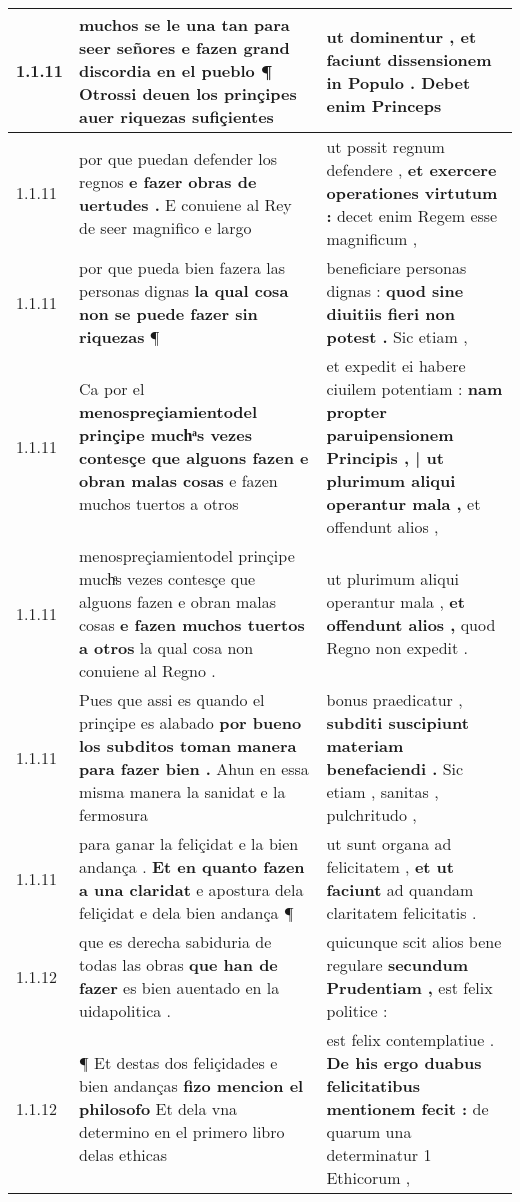 \begin{tabular}{|p{1cm}|p{6.5cm}|p{6.5cm}|}
1.1.11 & muchos se le una tan para seer señores \textbf{ e fazen grand discordia en el pueblo ¶ } Otrossi deuen los prinçipes auer riquezas sufiçientes & ut dominentur , \textbf{ et faciunt dissensionem in Populo . } Debet enim Princeps \\\hline
1.1.11 & por que puedan defender los regnos \textbf{ e fazer obras de uertudes . } E conuiene al Rey de seer magnifico e largo & ut possit regnum defendere , \textbf{ et exercere operationes virtutum : } decet enim Regem esse magnificum , \\\hline
1.1.11 & por que pueda bien fazera las personas dignas \textbf{ la qual cosa non se puede fazer sin riquezas } ¶ & beneficiare personas dignas : \textbf{ quod sine diuitiis fieri non potest . } Sic etiam , \\\hline
1.1.11 & Ca por el \textbf{ menospreçiamientodel prinçipe muchͣs vezes contesçe que alguons fazen e obran malas cosas } e fazen muchos tuertos a otros & et expedit ei habere ciuilem potentiam : \textbf{ nam propter paruipensionem Principis , | ut plurimum aliqui operantur mala , } et offendunt alios , \\\hline
1.1.11 & menospreçiamientodel prinçipe muchͣs vezes contesçe que alguons fazen e obran malas cosas \textbf{ e fazen muchos tuertos a otros } la qual cosa non conuiene al Regno . & ut plurimum aliqui operantur mala , \textbf{ et offendunt alios , } quod Regno non expedit . \\\hline
1.1.11 & Pues que assi es quando el prinçipe es alabado \textbf{ por bueno los subditos toman manera para fazer bien . } Ahun en essa misma manera la sanidat e la fermosura & bonus praedicatur , \textbf{ subditi suscipiunt materiam benefaciendi . } Sic etiam , sanitas , pulchritudo , \\\hline
1.1.11 & para ganar la feliçidat e la bien andança . \textbf{ Et en quanto fazen a una claridat } e apostura dela feliçidat e dela bien andança ¶ & ut sunt organa ad felicitatem , \textbf{ et ut faciunt } ad quandam claritatem felicitatis . \\\hline
1.1.12 & que es derecha sabiduria de todas las obras \textbf{ que han de fazer } es bien auentado en la uidapolitica . & quicunque scit alios bene regulare \textbf{ secundum Prudentiam , } est felix politice : \\\hline
1.1.12 & ¶ Et destas dos feliçidades e bien andanças \textbf{ fizo mencion el philosofo } Et dela vna determino en el primero libro delas ethicas & est felix contemplatiue . \textbf{ De his ergo duabus felicitatibus mentionem fecit : } de quarum una determinatur 1 Ethicorum , \\\hline

\end{tabular}
